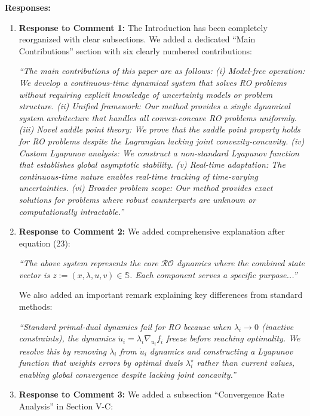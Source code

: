 \documentclass[journal,twoside,web]{ieeecolor}
\begin{document}
\noindent\textbf{Responses:}

\begin{enumerate}
\item \textbf{Response to Comment 1:} The Introduction has been completely reorganized with clear subsections. We added a dedicated ``Main Contributions'' section with six clearly numbered contributions:

{\color{revisionblue}\textit{``The main contributions of this paper are as follows: (i) Model-free operation: We develop a continuous-time dynamical system that solves RO problems without requiring explicit knowledge of uncertainty models or problem structure. (ii) Unified framework: Our method provides a single dynamical system architecture that handles all convex-concave RO problems uniformly. (iii) Novel saddle point theory: We prove that the saddle point property holds for RO problems despite the Lagrangian lacking joint convexity-concavity. (iv) Custom Lyapunov analysis: We construct a non-standard Lyapunov function that establishes global asymptotic stability. (v) Real-time adaptation: The continuous-time nature enables real-time tracking of time-varying uncertainties. (vi) Broader problem scope: Our method provides exact solutions for problems where robust counterparts are unknown or computationally intractable.''}}

\item \textbf{Response to Comment 2:} We added comprehensive explanation after equation (23):

{\color{revisionblue}\textit{``The above system represents the core $\mathcal{RO}$ dynamics where the combined state vector is $z:=(x,\lambda,u,v) \in \mathbb{S}$. Each component serves a specific purpose...''}}

We also added an important remark explaining key differences from standard methods:

{\color{revisionblue}\textit{``Standard primal-dual dynamics fail for RO because when $\lambda_i \to 0$ (inactive constraints), the dynamics $\dot{u}_i = \lambda_i \nabla_{u_i} f_i$ freeze before reaching optimality. We resolve this by removing $\lambda_i$ from $\dot{u}_i$ dynamics and constructing a Lyapunov function that weights errors by optimal duals $\lambda_i^\star$ rather than current values, enabling global convergence despite lacking joint concavity.''}}

\item \textbf{Response to Comment 3:} We added a subsection ``Convergence Rate Analysis'' in Section V-C:


\end{enumerate}
\end{document}
